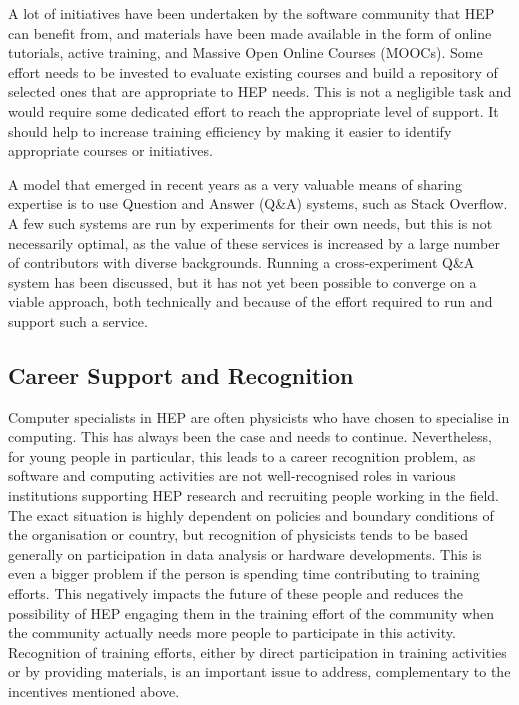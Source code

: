 A lot of initiatives have been undertaken by the software community that
HEP can benefit from, and materials have been made available in the form
of online tutorials, active training, and Massive Open Online Courses
(MOOCs). Some effort needs to be invested to evaluate existing courses
and build a repository of selected ones that are appropriate to HEP
needs. This is not a negligible task and would require some dedicated
effort to reach the appropriate level of support. It should help to
increase training efficiency by making it easier to identify appropriate
courses or initiatives.

A model that emerged in recent years as a very valuable means of sharing
expertise is to use Question and Answer (Q\&A) systems, such as Stack
Overflow. A few such systems are run by experiments for their own needs,
but this is not necessarily optimal, as the value of these services is
increased by a large number of contributors with diverse backgrounds.
Running a cross-experiment Q\&A system has been discussed, but it has
not yet been possible to converge on a viable approach, both technically
and because of the effort required to run and support such a service.

\subsection{Career Support and Recognition}

Computer specialists in HEP are often physicists who have chosen to
specialise in computing. This has always been the case and needs to
continue. Nevertheless, for young people in particular, this leads to a
career recognition problem, as software and computing activities are not
well-recognised roles in various institutions supporting HEP research
and recruiting people working in the field. The exact situation is
highly dependent on policies and boundary conditions of the organisation
or country, but recognition of physicists tends to be based generally on
participation in data analysis or hardware developments. This is even a
bigger problem if the person is spending time contributing to training
efforts. This negatively impacts the future of these people and reduces
the possibility of HEP engaging them in the training effort of the
community when the community actually needs more people to participate
in this activity. Recognition of training efforts, either by direct
participation in training activities or by providing materials, is an
important issue to address, complementary to the incentives mentioned
above.

